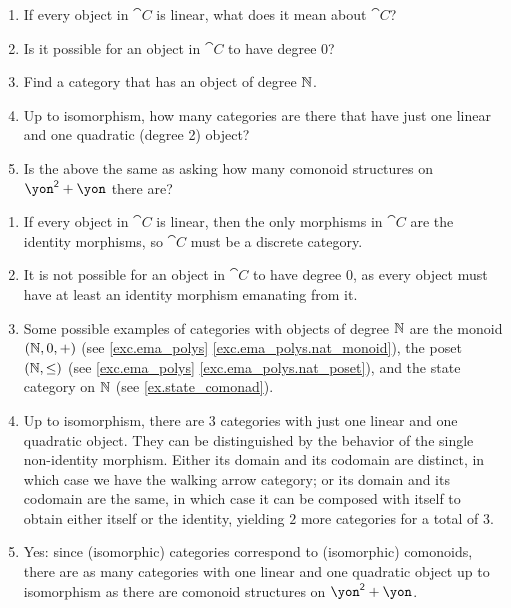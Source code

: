 \documentclass[Book-Poly]{subfiles}
\begin{document}
\begin{exercise}
\begin{enumerate}
	\item If every object in $\cat{C}$ is linear, what does it mean about $\cat{C}$?
	\item Is it possible for an object in $\cat{C}$ to have degree $0$?
	\item Find a category that has an object of degree $\mathbb{N}$.
	\item Up to isomorphism, how many categories are there that have just one linear and one quadratic (degree 2) object?
	\item Is the above the same as asking how many comonoid structures on $\yon^\2+\yon$ there are?\qedhere
\end{enumerate}
\begin{solution}
\begin{enumerate}
    \item If every object in $\cat{C}$ is linear, then the only morphisms in $\cat{C}$ are the identity morphisms, so $\cat{C}$ must be a discrete category.
    \item It is not possible for an object in $\cat{C}$ to have degree $0$, as every object must have at least an identity morphism emanating from it.
    \item Some possible examples of categories with objects of degree $\mathbb{N}$ are the monoid $(\mathbb{N}, 0, +)$ (see \cref{exc.ema_polys} \cref{exc.ema_polys.nat_monoid}), the poset $(\mathbb{N}, \leq)$ (see \cref{exc.ema_polys} \cref{exc.ema_polys.nat_poset}), and the state category on $\mathbb{N}$ (see \cref{ex.state_comonad}).
    \item Up to isomorphism, there are $3$ categories with just one linear and one quadratic object.
    They can be distinguished by the behavior of the single non-identity morphism.
    Either its domain and its codomain are distinct, in which case we have the walking arrow category; or its domain and its codomain are the same, in which case it can be composed with itself to obtain either itself or the identity, yielding $2$ more categories for a total of $3$.
    \item Yes: since (isomorphic) categories correspond to (isomorphic) comonoids, there are as many categories with one linear and one quadratic object up to isomorphism as there are comonoid structures on $\yon^\2+\yon$.
\end{enumerate}
\end{solution}
\end{exercise}
\end{document}
